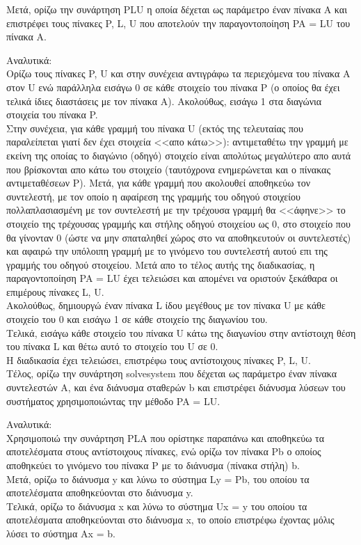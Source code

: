 \documentclass[a4paper,11pt]{article}
\newcommand{\lt}{\latintext}
\begin{document}
Μετά, ορίζω την συνάρτηση {\lt PLU} η οποία δέχεται ως παράμετρο έναν πίνακα A και επιστρέφει τους πίνακες {\lt P, L, U} που αποτελούν την παραγοντοποίηση {\lt PA = LU} του πίνακα Α.
\par
Αναλυτικά:\\
Ορίζω τους πίνακες {\lt P, U} και στην συνέχεια αντιγράφω τα περιεχόμενα του πίνακα Α στον {\lt U} ενώ παράλληλα εισάγω 0 σε κάθε στοιχείο του πίνακα {\lt P} (ο οποίος θα έχει τελικά ίδιες διαστάσεις με τον πίνακα Α). Ακολούθως, εισάγω 1 στα διαγώνια στοιχεία του πίνακα {\lt P}.\\
Στην συνέχεια, για κάθε γραμμή του πίνακα {\lt U} (εκτός της τελευταίας που παραλείπεται γιατί δεν έχει στοιχεία <<απο κάτω>>): αντιμεταθέτω την γραμμή με εκείνη της οποίας το διαγώνιο (οδηγό) στοιχείο είναι απολύτως μεγαλύτερο απο αυτά που βρίσκονται απο κάτω του στοιχείο (ταυτόχρονα ενημερώνεται και ο πίνακας αντιμεταθέσεων {\lt P}). Μετά, για κάθε γραμμή που ακολουθεί αποθηκεύω τον συντελεστή, με τον οποίο η αφαίρεση της γραμμής του οδηγού στοιχείου πολλαπλασιασμένη με τον συντελεστή με την τρέχουσα γραμμή θα <<άφηνε>> το στοιχείο της τρέχουσας γραμμής και στήλης οδηγού στοιχείου ως 0, στο στοιχείο που θα γίνονταν 0 (ώστε να μην σπαταληθεί χώρος στο να αποθηκευτούν οι συντελεστές) και αφαιρώ την υπόλοιπη γραμμή με το γινόμενο του συντελεστή αυτού επι της γραμμής του οδηγού στοιχείου. Μετά απο το τέλος αυτής της διαδικασίας, η παραγοντοποίηση {\lt PA = LU} έχει τελειώσει και απομένει να οριστούν ξεκάθαρα οι επιμέρους πίνακες {\lt L, U}.\\
Ακολούθως, δημιουργώ έναν πίνακα {\lt L} ίδου μεγέθους με τον πίνακα {\lt U} με κάθε στοιχείο του 0 και εισάγω 1 σε κάθε στοιχείο της διαγωνίου του.\\
Τελικά, εισάγω κάθε στοιχείο του πίνακα {\lt U} κάτω της διαγωνίου στην αντίστοιχη θέση του πίνακα {\lt L} και θέτω αυτό το στοιχείο του {\lt U} σε 0.\\
Η διαδικασία έχει τελειώσει, επιστρέφω τους αντίστοιχους πίνακες {\lt P, L, U}.\\

Τέλος, ορίζω την συνάρτηση {\lt solve\textunderscore system} που δέχεται ως παράμετρο έναν πίνακα συντελεστών A, και ένα διάνυσμα σταθερών {\lt b} και επιστρέφει διάνυσμα λύσεων του συστήματος χρησιμοποιώντας την μέθοδο {\lt PA = LU}.
\par
Αναλυτικά:\\
Χρησιμοποιώ την συνάρτηση {\lt PLA} που ορίστηκε παραπάνω και αποθηκεύω τα αποτελέσματα στους αντίστοιχους πίνακες, ενώ ορίζω τον πίνακα {\lt Pb} ο οποίος αποθηκεύει το γινόμενο του πίνακα {\lt P} με το διάνυσμα (πίνακα στήλη) {\lt b}.\\
Μετά, ορίζω το διάνυσμα {\lt y} και λύνω το σύστημα {\lt Ly = Pb}, του οποίου τα αποτελέσματα αποθηκεύονται στο διάνυσμα {\lt y}.\\
Τελικά, ορίζω το διάνυσμα {\lt x} και λύνω το σύστημα {\lt Ux = y} του οποίου τα αποτελέσματα αποθηκεύονται στο διάνυσμα {\lt x}, το οποίο επιστρέφω έχοντας μόλις λύσει το σύστημα {\lt Ax = b}.\\
\end{document}
